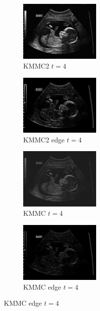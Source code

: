 \documentclass[a4paper,10pt,twocolumn]{article}
\begin{document}
\begin{center}
\begin{figure}[!htb]
		
		\begin{subfigure}[d!]{4cm}
			\includegraphics[width=4cm]{image/im3/im_3_4}
			\caption{KMMC2 $t = 4$}
		\end{subfigure}
		\begin{subfigure}[e!]{4cm}
			\includegraphics[width=4cm]{image/im3/im_3_4_edge}
			\caption{KMMC2 edge $t = 4$}
		\end{subfigure}
		\begin{subfigure}[f!]{4cm}
			\includegraphics[width=4cm]{image/im3/im_3_4_norm}
			\caption{KMMC $t = 4$}
		\end{subfigure}
		\begin{subfigure}[g!]{4cm}
			\includegraphics[width=4cm]{image/im3/im_3_4_norm_edge}
			\caption{KMMC edge $t = 4$}
		\end{subfigure}
		

\end{figure}
\end{center}
\end{document}
